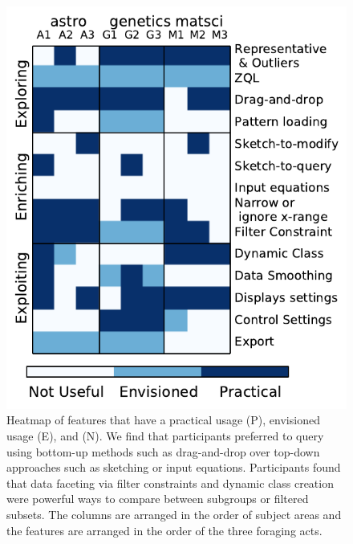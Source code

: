 \begin{figure}[ht!]
    \centering
    \includegraphics[width=0.7\columnwidth]{figures/result2.pdf}
    \vspace{-6pt}\caption{Heatmap of features that have a practical usage (P), envisioned usage (E), and  (N). We find that participants preferred to query using bottom-up methods such as drag-and-drop over top-down approaches such as sketching or input equations. Participants found that data faceting via filter constraints and dynamic class creation were powerful ways to compare between subgroups or filtered subsets. The columns are arranged in the order of subject areas and the features are arranged in the order of the three foraging acts.}
    \label{feature_heatmap}
    \vspace{-5pt}
\end{figure}

